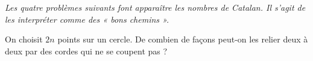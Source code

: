 \emph{Les quatre problèmes suivants font apparaître les nombres de Catalan. Il s'agit de les interpréter comme des « bons chemins ».}

On choisit $2n$ points sur un cercle. De combien de façons peut-on les relier deux à deux par des cordes qui ne se coupent pas ?
